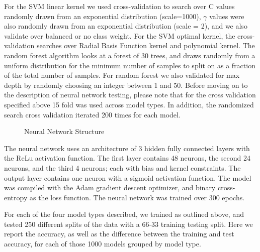 \documentclass[12pt]{article}
\begin{document}
For the SVM linear kernel we used cross-validation to search over C values randomly drawn from an exponential distribution (scale=1000), $\gamma$ values were also randomly drawn from an exponential distribution (scale = 2), and we also validate over balanced or no class weight. For the SVM optimal kernel, the cross-validation searches over Radial Basis Function kernel and polynomial kernel. The random forest algorithm looks at a forest of 30 trees, and draws randomly from a uniform distribution for the minimum number of samples to split on as a fraction of the total number of samples. For random forest we also validated for max depth by randomly choosing an integer between 1 and 50. Before moving on to the description of neural network testing, please note that for the cross validation specified above 15 fold was used across model types. In addition, the randomized search cross validation iterated 200 times for each model.

\begin{figure}[H]
\caption{Neural Network Structure}
\end{figure}

The neural network uses an architecture of 3 hidden fully connected layers with the ReLu activation function. The first layer contains 48 neurons, the second 24 neurons, and the third 4 neurons; each with bias and kernel constraints. The output layer contains one neuron with a sigmoid activation function. The model was compiled with the Adam gradient descent optimizer, and binary cross-entropy as the loss function. The neural network was trained over 300 epochs. 

For each of the four model types described, we trained as outlined above, and tested 250 different splits of the data with a 66-33 training testing split. Here we report the accuracy, as well as the difference between the training and test accuracy, for each of those 1000 models grouped by model type.
\end{document}
